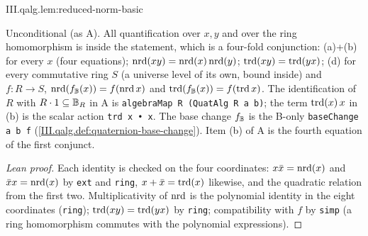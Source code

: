 \begin{lemma}
\end{lemma}
\begin{tfformal}{III.qalg.lem:reduced-norm-basic}
\begin{tffidelity}
Unconditional (as A). All quantification over $x,y$ and over the ring homomorphism is inside the statement, which is a four-fold conjunction: (a)+(b) for every $x$ (four equations); $\operatorname{nrd}(xy)=\operatorname{nrd}(x)\operatorname{nrd}(y)$; $\operatorname{trd}(xy)=\operatorname{trd}(yx)$; (d) for every commutative ring $S$ (a universe level of its own, bound inside) and $f\colon R\to S$, $\operatorname{nrd}(f_{\mathbb{B}}(x))=f(\operatorname{nrd} x)$ and $\operatorname{trd}(f_{\mathbb{B}}(x))=f(\operatorname{trd} x)$. The identification of $R$ with $R\cdot1\subseteq\mathbb{B}_R$ in A is \texttt{algebraMap R (QuatAlg R a b)}; the term $\operatorname{trd}(x)\,x$ in (b) is the scalar action \texttt{trd x • x}. The base change $f_{\mathbb{B}}$ is the B-only \texttt{baseChange a b f} (\cref{III.qalg.def:quaternion-base-change}). Item (b) of A is the fourth equation of the first conjunct.
\end{tffidelity}
\end{tfformal}
\begin{proof}[Lean proof]
Each identity is checked on the four coordinates: $x\bar x=\operatorname{nrd}(x)$ and $\bar x x=\operatorname{nrd}(x)$ by \texttt{ext} and \texttt{ring}, $x+\bar x=\operatorname{trd}(x)$ likewise, and the quadratic relation from the first two. Multiplicativity of $\operatorname{nrd}$ is the polynomial identity in the eight coordinates (\texttt{ring}); $\operatorname{trd}(xy)=\operatorname{trd}(yx)$ by \texttt{ring}; compatibility with $f$ by \texttt{simp} (a ring homomorphism commutes with the polynomial expressions).
\end{proof}

